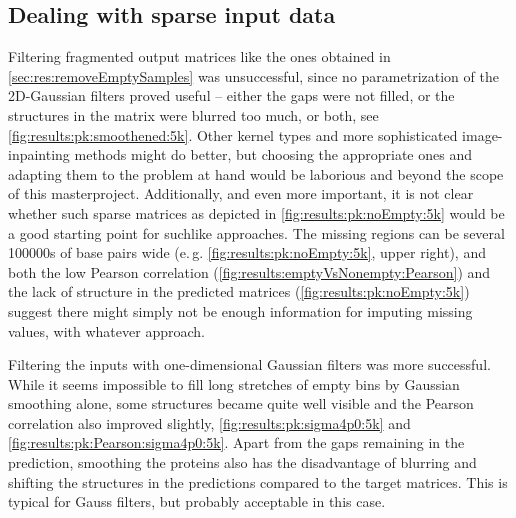 \subsection{Dealing with sparse input data} \label{sec:res:dealing_with_sparse_input}
Filtering fragmented output matrices like the ones obtained in \autoref{sec:res:removeEmptySamples} 
was unsuccessful, since no parametrization of the 2D-Gaussian filters proved useful -- either the gaps were not 
filled, or the structures in the matrix were
blurred too much, or both, see \autoref{fig:results:pk:smoothened:5k}.
Other kernel types and more sophisticated image-inpainting methods \cite{Elharrouss2019}
might do better, but choosing the appropriate ones and adapting them to the problem at hand would be 
laborious and beyond the scope of this masterproject.
Additionally, and even more important, it is not clear whether such sparse matrices as depicted in
\autoref{fig:results:pk:noEmpty:5k} would be a good starting point for suchlike approaches. 
The missing regions can be several \num{100000}s of base pairs wide (e.\,g. \autoref{fig:results:pk:noEmpty:5k}, upper right),
and both the low Pearson correlation (\autoref{fig:results:emptyVsNonempty:Pearson}) and the lack of structure in the predicted matrices
(\autoref{fig:results:pk:noEmpty:5k}) suggest there might simply not be enough information 
for imputing missing values, with whatever approach.

Filtering the inputs with one-dimensional Gaussian filters was more successful.
While it seems impossible to fill long stretches of empty bins by Gaussian smoothing alone, some structures became quite well visible
and the Pearson correlation also improved slightly, \autoref{fig:results:pk:sigma4p0:5k} and \ref{fig:results:pk:Pearson:sigma4p0:5k}.
Apart from the gaps remaining in the prediction, smoothing the proteins also has the disadvantage of blurring and shifting the structures in 
the predictions compared to the target matrices.
This is typical for Gauss filters, but probably acceptable in this case.


